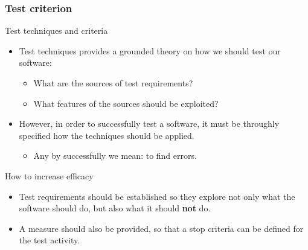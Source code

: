 \begin{frame}[parent={cmap:software-testing-foundations}, hasprev=false, hasnext=true]
\frametitle{Test criterion}

\begin{block:fact}{Test techniques and criteria}
\begin{itemize}
	\item Test techniques provides a grounded theory on how we should test our
	software:
	\begin{itemize}
		\item What are the sources of test requirements?

		\item What features of the sources should be exploited?
	\end{itemize}

	\item However, in order to successfully test a software, it must be
	throughly specified how the techniques should be applied.
	\begin{itemize}
		\item Any by successfully we mean: to find errors.
	\end{itemize}
\end{itemize}
\end{block:fact}


\begin{block:fact}{How to increase efficacy}
\begin{itemize}
	\item Test requirements should be established so they explore not only
	what the software should do, but also what it should \textbf{not} do.

	\item A measure should also be provided, so that a stop criteria can be
	defined for the test activity.
\end{itemize}
\end{block:fact}
\end{frame}



